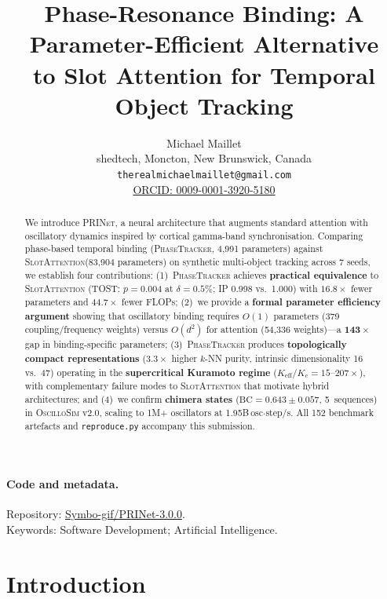 \documentclass[11pt]{article}
\title{Phase-Resonance Binding: A Parameter-Efficient Alternative\\
       to Slot Attention for Temporal Object Tracking}
\author{%
Michael Maillet\\
shedtech, Moncton, New Brunswick, Canada\\
\texttt{therealmichaelmaillet@gmail.com}\\
\href{https://orcid.org/0009-0001-3920-5180}{ORCID: 0009-0001-3920-5180}
}
\date{}
\providecommand{\prinet}{\textnormal{\textsc{PRINet}}\xspace}
\providecommand{\oscillosim}{\textnormal{\textsc{OscilloSim}}\xspace}
\providecommand{\pt}{\textnormal{\textsc{PhaseTracker}}\xspace}
\providecommand{\sa}{\textnormal{\textsc{SlotAttention}}\xspace}
\providecommand{\bc}{\text{BC}}
\begin{document}
\maketitle

\begin{abstract}
We introduce \prinet, a neural architecture that augments standard
attention with oscillatory dynamics inspired by cortical gamma-band
synchronisation.  Comparing phase-based temporal binding
(\pt, 4{,}991 parameters) against \sa (83{,}904 parameters) on
synthetic multi-object tracking across 7 seeds, we establish four
contributions:
(1)~\pt achieves \textbf{practical equivalence} to \sa
(TOST: $p = 0.004$ at $\delta = 0.5\%$; IP 0.998 vs.\ 1.000)
with $\mathbf{16.8\times}$ fewer parameters and
$\mathbf{44.7\times}$ fewer FLOPs;
(2)~we provide a \textbf{formal parameter efficiency argument}
showing that oscillatory binding requires $O(1)$ parameters
(379 coupling/frequency weights) versus $O(d^2)$ for attention
(54{,}336 weights)---a $\mathbf{143\times}$ gap in binding-specific
parameters;
(3)~\pt produces \textbf{topologically compact representations}
($3.3\times$ higher $k$-NN purity, intrinsic dimensionality 16
vs.\ 47) operating in the \textbf{supercritical Kuramoto regime}
($K_{\text{eff}}/K_c = 15$--$207\times$), with complementary failure
modes to \sa that motivate hybrid architectures; and
(4)~we confirm \textbf{chimera states} ($\bc = 0.643 \pm 0.057$,
5~sequences) in \oscillosim v2.0, scaling to 1M+ oscillators at
1.95B\,osc$\cdot$step/s.
All 152 benchmark artefacts and \texttt{reproduce.py} accompany
this submission.
\end{abstract}

\paragraph{Code and metadata.}
Repository: \href{https://github.com/Symbo-gif/PRINet-3.0.0}{Symbo-gif/PRINet-3.0.0}.\\
Keywords: Software Development; Artificial Intelligence.

\section{Introduction}
\label{sec:intro}
\end{document}
